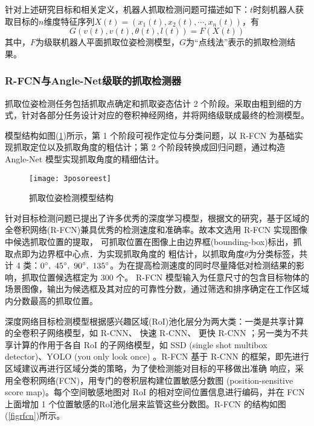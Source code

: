 \documentclass[no-math, withoutpreface]{YangThesis}
\begin{document}
针对上述研究目标和相关定义，机器人抓取检测问题可描述如下：$t$时刻机器人获取目标的$n$维度特征序列$X (t) = (x_1(t), x_2(t),\cdots, x_n(t))$，有
\begin{equation}
G(v(t), v(t), \theta(t), l(t)) = F(X (t))
\end{equation}
其中，$F$为级联机器人平面抓取位姿检测模型，$G$为“点线法”表示的抓取检测结果。

\subsubsection{R-FCN与Angle-Net级联的抓取检测器}

抓取位姿检测任务包括抓取点确定和抓取姿态估计 2 个阶段。采取由粗到细的方式，针对各部分任务设计对应的卷积神经网络，并将网络级联成最终的检测模型。

模型结构如图(\ref{figpoe})所示，第 1 个阶段可视作定位与分类问题，以 R-FCN 为基础实现抓取定位以及抓取角度的粗估计；第 2 个阶段转换成回归问题，通过构造 Angle-Net 模型实现抓取角度的精细估计。

\begin{figure}[!htbp]
	\centering
	\texttt{[image: 3posoreest]}
	\caption{抓取位姿检测模型结构}
     \label{figpoe}
\end{figure}

针对目标检测问题已提出了许多优秀的深度学习模型，根据文\cite{bibb14}的研究，基于区域的全卷积网络(R-FCN)兼具优秀的检测速度和准确率。故本文选用 R-FCN 实现图像中候选抓取位置的提取， 可抓取位置在图像上由边界框(bounding-box)标出，抓取点即为边界框中心点．为实现抓取角度的 粗估计，以抓取角度$\theta$为分类标签，共计 4 类：$0\degree,\ 45\degree,\ 90\degree,\ 135\degree$。为在提高检测速度的同时尽量降低对检测结果的影响，抓取位置候选框定为 300 个。 R-FCN 模型输入为任意尺寸的包含目标物体的场景图像，输出为候选框及其对应的可靠性分数，通过筛选和排序确定在工作区域内分数最高的抓取位置。

深度网络目标检测模型根据感兴趣区域(RoI)池化层分为两大类：一类是共享计算的全卷积子网络模型，如 R-CNN\cite{bibb15}、 快速 R-CNN\cite{bibb16}、 更快 R-CNN \cite{bibb17}；另一类为不共享计算的作用于各自 RoI 的子网络模型，如 SSD (single shot multibox detector)\cite{bibb18}、YOLO (you only look once) \cite{bibb19}。R-FCN 基于 R-CNN 的框架，即先进行区域建议再进行区域分类的策略，为了使检测能对目标的平移做出准确 响应，采用全卷积网络(FCN)，用专门的卷积层构建位置敏感分数图 (position-sensitive score map)。每个空间敏感地图对 RoI 的相对空间位置信息进行编码，并在 FCN 上面增加 1 个位置敏感的RoI池化层来监管这些分数图。R-FCN 的结构如图(\ref{figrfcn})所示。
\end{document}
